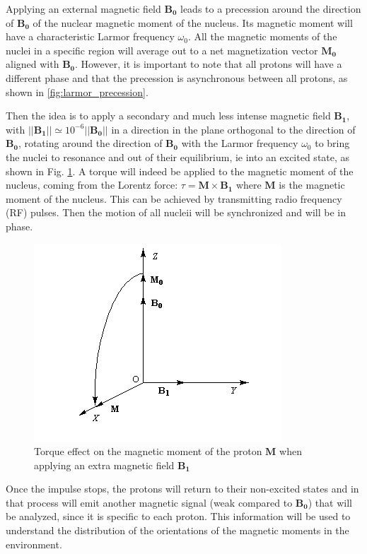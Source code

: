 Applying an external magnetic field $\mathbf{B_0}$ leads to a precession around the direction of $\mathbf{B_0}$ of the nuclear magnetic moment of the nucleus. Its magnetic moment will have a characteristic Larmor frequency $\omega_0$. All the magnetic moments of the nuclei in a specific region will average out to a net magnetization vector $\mathbf{M_0}$ aligned with $\mathbf{B_0}$. However, it is important to note that all protons will have a different phase and that the precession is asynchronous between all protons, as shown in \ref{fig:larmor_precession}.

Then the idea is to apply a secondary and much less intense magnetic field $\mathbf{B_1}$, with $||\mathbf{B_1}|| \simeq 10^{-6}||\mathbf{B_0}||$ in a direction in the plane orthogonal to the direction of $\mathbf{B_0}$, rotating around the direction of $\mathbf{B_0}$ with the Larmor frequency $\omega_0$ to bring the nuclei to resonance and out of their equilibrium, ie into an excited state, as shown in Fig. \ref{fig:spin_excitation}. A torque will indeed be applied to the magnetic moment of the nucleus, coming from the Lorentz force: $\tau = \mathbf{M} \times \mathbf{B_1}$ where $\mathbf{M}$ is the magnetic moment of the nucleus. This can be achieved by transmitting radio frequency (RF) pulses. Then the motion of all nucleii will be synchronized and will be in phase.

\begin{figure}
    \centering
    \includegraphics[width=.5\textwidth]{figures/spin_excitation}
    \caption{Torque effect on the magnetic moment of the proton $\mathbf{M}$ when applying an extra magnetic field $\mathbf{B_1}$}
    \label{fig:spin_excitation}
\end{figure}

Once the impulse stops, the protons will return to their non-excited states and in that process will emit another magnetic signal (weak compared to $\mathbf{B_0}$) that will be analyzed, since it is specific to each proton. This information will be used to understand the distribution of the orientations of the magnetic moments in the environment.

